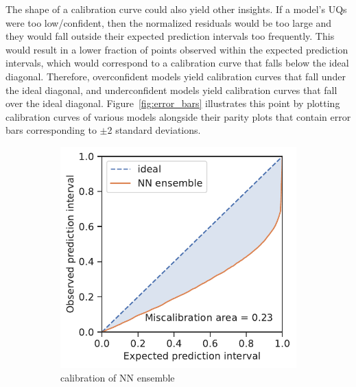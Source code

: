 \documentclass[]{achemso}
\begin{document}
The shape of a calibration curve could also yield other insights.
If a model's \gls{UQ}s were too low/confident, then the normalized residuals would be too large and they would fall outside their expected prediction intervals too frequently.
This would result in a lower fraction of points observed within the expected prediction intervals, which would correspond to a calibration curve that falls below the ideal diagonal.
Therefore, overconfident models yield calibration curves that fall under the ideal diagonal, and underconfident models yield calibration curves that fall over the ideal diagonal.
Figure~\ref{fig:error_bars} illustrates this point by plotting calibration curves of various models alongside their parity plots that contain error bars corresponding to $\pm$2 standard deviations.

\begin{figure}
    \centering
    \begin{subfigure}[b]{0.32\textwidth}
        \includegraphics[width=\textwidth]{../NN_ensemble/calibration.pdf}
        \caption{calibration of \gls{NN} ensemble}\label{fig:calibration_example_ensemble}
    \end{subfigure}
    \begin{subfigure}[b]{0.32\textwidth}

\end{subfigure}
\end{figure}
\end{document}
